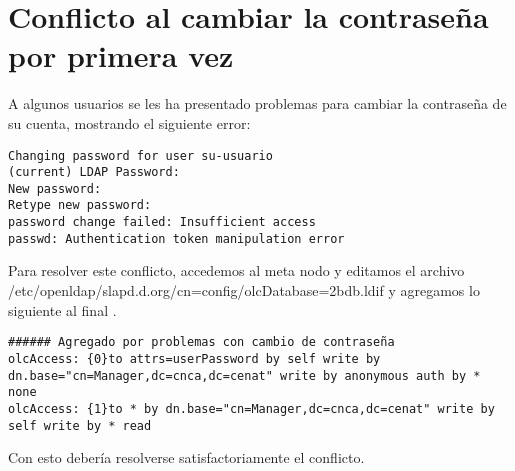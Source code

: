\section{Conflicto al cambiar la contraseña por primera vez}
A algunos usuarios se les ha presentado problemas para cambiar la contraseña de su cuenta, mostrando el siguiente error:
\begin{lstlisting}
Changing password for user su-usuario
(current) LDAP Password: 
New password: 
Retype new password: 
password change failed: Insufficient access
passwd: Authentication token manipulation error
\end{lstlisting}
Para resolver este conflicto, accedemos al meta nodo y editamos el archivo 
/etc/openldap/slapd.d.org/cn=config/olcDatabase={2}bdb.ldif y agregamos lo siguiente al final \cite{passwdldap}.
\begin{lstlisting}
###### Agregado	por problemas con cambio de contraseña
olcAccess: {0}to attrs=userPassword by self write by dn.base="cn=Manager,dc=cnca,dc=cenat" write by anonymous auth by * none
olcAccess: {1}to * by dn.base="cn=Manager,dc=cnca,dc=cenat" write by self write by * read
\end{lstlisting}
Con esto debería resolverse satisfactoriamente el conflicto.
\clearpage